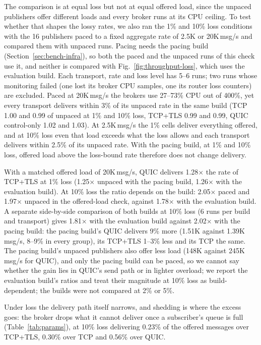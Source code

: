 \documentclass[a4paper,fleqn]{cas-dc}
\begin{document}
The comparison is at equal loss but not at equal offered load, since the unpaced publishers offer different loads and every broker runs at its CPU ceiling. To test whether that shapes the lossy rates, we also ran the 1\% and 10\% loss conditions with the 16 publishers paced to a fixed aggregate rate of 2.5K or 20K\,msg/s and compared them with unpaced runs. Pacing needs the pacing build (Section~\ref{sec:bench-infra}), so both the paced and the unpaced runs of this check use it, and neither is compared with Fig.~\ref{fig:throughput-loss}, which uses the evaluation build. Each transport, rate and loss level has 5--6 runs; two runs whose monitoring failed (one lost its broker CPU samples, one its router loss counters) are excluded. Paced at 20K\,msg/s the brokers use 27--73\% CPU out of 400\%, yet every transport delivers within 3\% of its unpaced rate in the same build (TCP 1.00 and 0.99 of unpaced at 1\% and 10\% loss, TCP+TLS 0.99 and 0.99, QUIC control-only 1.02 and 1.03). At 2.5K\,msg/s the 1\% cells deliver everything offered, and at 10\% loss even that load exceeds what the loss allows and each transport delivers within 2.5\% of its unpaced rate. With the pacing build, at 1\% and 10\% loss, offered load above the loss-bound rate therefore does not change delivery.

With a matched offered load of 20K\,msg/s, QUIC delivers 1.28$\times$ the rate of TCP+TLS at 1\% loss (1.25$\times$ unpaced with the pacing build, 1.26$\times$ with the evaluation build). At 10\% loss the ratio depends on the build: 2.05$\times$ paced and 1.97$\times$ unpaced in the offered-load check, against 1.78$\times$ with the evaluation build. A separate side-by-side comparison of both builds at 10\% loss (6 runs per build and transport) gives 1.81$\times$ with the evaluation build against 2.02$\times$ with the pacing build: the pacing build's QUIC delivers 9\% more (1.51K against 1.39K\,msg/s, 8--9\% in every group), its TCP+TLS 1--3\% less and its TCP the same. The pacing build's unpaced publishers also offer less load (148K against 245K\,msg/s for QUIC), and only the pacing build can be paced, so we cannot say whether the gain lies in QUIC's send path or in lighter overload; we report the evaluation build's ratios and treat their magnitude at 10\% loss as build-dependent; the builds were not compared at 2\% or 5\%.

Under loss the delivery path itself narrows, and shedding is where the excess goes: the broker drops what it cannot deliver once a subscriber's queue is full (Table~\ref{tab:params}), at 10\% loss delivering 0.23\% of the offered messages over TCP+TLS, 0.30\% over TCP and 0.56\% over QUIC.
\end{document}
